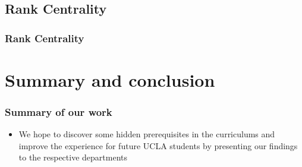 \documentclass{beamer}
\begin{document}
\subsection{Rank Centrality}
\begin{frame}
     \frametitle{Rank Centrality}
\end{frame}

\section{Summary and conclusion}  \label{sec:conclusion}

\begin{frame}
\frametitle{Summary of our work}
\begin{itemize}
\item We hope to discover some hidden prerequisites in the curriculums and improve the experience for future UCLA students by presenting our findings to the respective departments
\end{itemize} 
\end{frame}
\end{document}
